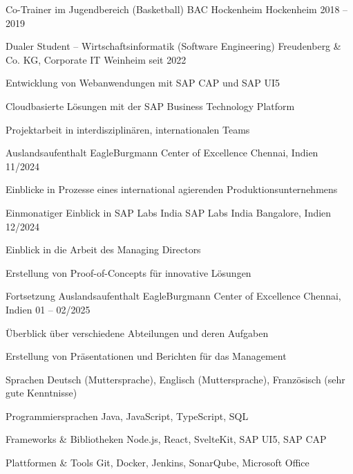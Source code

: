 \documentclass[11pt, a4paper]{awesome-cv}
\begin{document}
\begin{cventries}

\cventry
  {Co-Trainer im Jugendbereich (Basketball)}
  {BAC Hockenheim}
  {Hockenheim}
  {2018 -- 2019}
  {}

\cventry
  {Dualer Student – Wirtschaftsinformatik (Software Engineering)}
  {Freudenberg \& Co. KG, Corporate IT}
  {Weinheim}
  {seit 2022}
  {
    \begin{cvitems}
      \item {Entwicklung von Webanwendungen mit SAP CAP und SAP UI5}
      \item {Cloudbasierte Lösungen mit der SAP Business Technology Platform}
      \item {Projektarbeit in interdisziplinären, internationalen Teams}
    \end{cvitems}
  }

\cventry
  {Auslandsaufenthalt}
  {EagleBurgmann Center of Excellence}
  {Chennai, Indien}
  {11/2024}
  {
    \begin{cvitems}
      \item {Einblicke in Prozesse eines international agierenden Produktionsunternehmens}
    \end{cvitems}
  }

\cventry
  {Einmonatiger Einblick in SAP Labs India}
  {SAP Labs India}
  {Bangalore, Indien}
  {12/2024}
  {
    \begin{cvitems}
      \item {Einblick in die Arbeit des Managing Directors}
      \item {Erstellung von Proof-of-Concepts für innovative Lösungen}
    \end{cvitems}
  }

\cventry
  {Fortsetzung Auslandsaufenthalt}
  {EagleBurgmann Center of Excellence}
  {Chennai, Indien}
  {01 -- 02/2025}
  {
    \begin{cvitems}
      \item {Überblick über verschiedene Abteilungen und deren Aufgaben}
      \item {Erstellung von Präsentationen und Berichten für das Management}
    \end{cvitems}
  }

\end{cventries}


\begin{cvskills}

\cvskill
{Sprachen}
{Deutsch (Muttersprache), Englisch (Muttersprache), Französisch (sehr gute Kenntnisse)}

\cvskill
{Programmiersprachen}
{Java, JavaScript, TypeScript, SQL}

\cvskill
{Frameworks \& Bibliotheken}
{Node.js, React, SvelteKit, SAP UI5, SAP CAP}

\cvskill
{Plattformen \& Tools}
{Git, Docker, Jenkins, SonarQube, Microsoft Office}

\end{cvskills}
\end{document}
